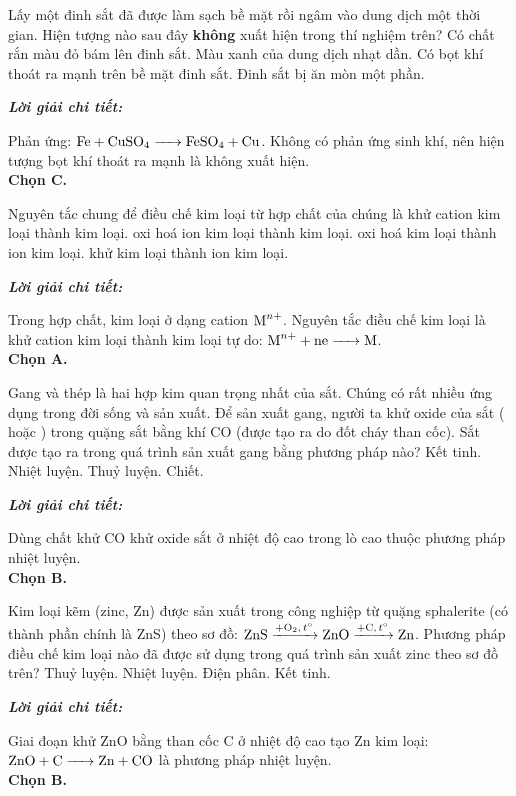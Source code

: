 \documentclass[11pt,a4paper]{article}
\def\loigiai#1{
\par\begingroup\color{blue!80!black}\small
\noindent\textbf{\textit{Lời giải chi tiết:}}\par
#1\par\endgroup}
\begin{document}
\begin{ex}
Lấy một đinh sắt đã được làm sạch bề mặt rồi ngâm vào dung dịch  một thời gian. Hiện tượng nào sau đây \textbf{không} xuất hiện trong thí nghiệm trên?
\choice
{Có chất rắn màu đỏ bám lên đinh sắt.}
{Màu xanh của dung dịch nhạt dần.}
{\True Có bọt khí thoát ra mạnh trên bề mặt đinh sắt.}
{Đinh sắt bị ăn mòn một phần.}
\loigiai{
Phản ứng: $\ce{Fe + CuSO4 -> FeSO4 + Cu}$. Không có phản ứng sinh khí, nên hiện tượng bọt khí thoát ra mạnh là không xuất hiện.\\
\textbf{Chọn C.}}
\end{ex}

\begin{ex}
Nguyên tắc chung để điều chế kim loại từ hợp chất của chúng là
\choice
{\True khử cation kim loại thành kim loại.}
{oxi hoá ion kim loại thành kim loại.}
{oxi hoá kim loại thành ion kim loại.}
{khử kim loại thành ion kim loại.}
\loigiai{
Trong hợp chất, kim loại ở dạng cation $\ce{M^{n+}}$. Nguyên tắc điều chế kim loại là khử cation kim loại thành kim loại tự do: $\ce{M^{n+} + ne -> M}$.\\
\textbf{Chọn A.}}
\end{ex}

\begin{ex}
Gang và thép là hai hợp kim quan trọng nhất của sắt. Chúng có rất nhiều ứng dụng trong đời sống và sản xuất. Để sản xuất gang, người ta khử oxide của sắt ( hoặc ) trong quặng sắt bằng khí CO (được tạo ra do đốt cháy than cốc). Sắt được tạo ra trong quá trình sản xuất gang bằng phương pháp nào?
\choice
{Kết tinh.}
{\True Nhiệt luyện.}
{Thuỷ luyện.}
{Chiết.}
\loigiai{
Dùng chất khử CO khử oxide sắt ở nhiệt độ cao trong lò cao thuộc phương pháp nhiệt luyện.\\
\textbf{Chọn B.}}
\end{ex}

\begin{ex}
Kim loại kẽm (zinc, Zn) được sản xuất trong công nghiệp từ quặng sphalerite (có thành phần chính là ZnS) theo sơ đồ: $\ce{ZnS} \xrightarrow{+\ce{O2},\, t^\circ} \ce{ZnO} \xrightarrow{+\ce{C},\, t^\circ} \ce{Zn}$. Phương pháp điều chế kim loại nào đã được sử dụng trong quá trình sản xuất zinc theo sơ đồ trên?
\choice
{Thuỷ luyện.}
{\True Nhiệt luyện.}
{Điện phân.}
{Kết tinh.}
\loigiai{
Giai đoạn khử ZnO bằng than cốc C ở nhiệt độ cao tạo Zn kim loại: $\ce{ZnO + C -> Zn + CO}$ là phương pháp nhiệt luyện.\\
\textbf{Chọn B.}}
\end{ex}
\end{document}
